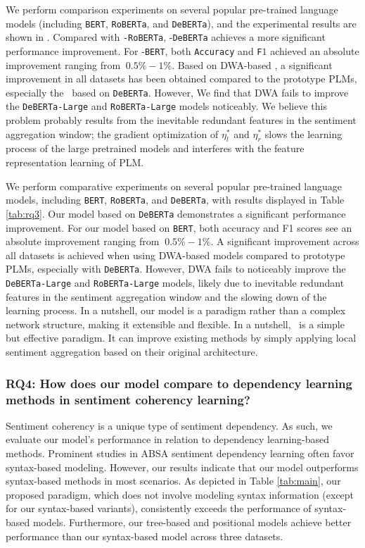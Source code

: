 \label{sec:rq3}
We perform comparison experiments on several popular pre-trained language models (including \texttt{BERT}, \texttt{RoBERTa}, and \texttt{DeBERTa}), and the experimental results are shown in . Compared with \texttt{\our-RoBERTa}, \our-\texttt{DeBERTa} achieves a more significant performance improvement. For \our-\texttt{BERT}, both \texttt{Accuracy} and \texttt{F$1$} achieved an absolute improvement ranging from $~0.5\%-1\%$. Based on DWA-based \our, a significant improvement in all datasets has been obtained compared to the prototype PLMs, especially the \our\ based on \texttt{DeBERTa}. 
However, We find that DWA fails to improve the \texttt{DeBERTa-Large} and \texttt{RoBERTa-Large} models noticeably. We believe this problem probably results from the inevitable redundant features in the sentiment aggregation window; the gradient optimization of $\eta_{l}^{*}$ and $\eta_{r}^{*}$ slows the learning process of the large pretrained models and interferes with the feature representation learning of PLM.



We perform comparative experiments on several popular pre-trained language models, including \texttt{BERT}, \texttt{RoBERTa}, and \texttt{DeBERTa}, with results displayed in Table \ref{tab:rq3}. Our model based on \texttt{DeBERTa} demonstrates a significant performance improvement. For our model based on \texttt{BERT}, both accuracy and F1 scores see an absolute improvement ranging from $~0.5\%-1\%$. A significant improvement across all datasets is achieved when using DWA-based models compared to prototype PLMs, especially with \texttt{DeBERTa}. However, DWA fails to noticeably improve the \texttt{DeBERTa-Large} and \texttt{RoBERTa-Large} models, likely due to inevitable redundant features in the sentiment aggregation window and the slowing down of the learning process. In a nutshell, our model is a paradigm rather than a complex network structure, making it extensible and flexible. In a nutshell, \our\ is a simple but effective paradigm. It can improve existing methods by simply applying local sentiment aggregation based on their original architecture. 

\subsubsection*{RQ4: How does our model compare to dependency learning methods in sentiment coherency learning?}
\label{sec:rq4}

Sentiment coherency is a unique type of sentiment dependency. As such, we evaluate our model's performance in relation to dependency learning-based methods. Prominent studies in ABSA sentiment dependency learning often favor syntax-based modeling. However, our results indicate that our model outperforms syntax-based methods in most scenarios. As depicted in Table \ref{tab:main}, our proposed paradigm, which does not involve modeling syntax information (except for our syntax-based variants), consistently exceeds the performance of syntax-based models. Furthermore, our tree-based and positional models achieve better performance than our syntax-based model across three datasets.

